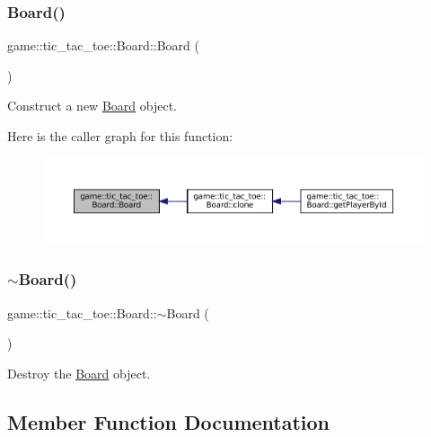 \subsubsection{\texorpdfstring{Board()}{Board()}}
{\footnotesize\ttfamily game\+::tic\+\_\+tac\+\_\+toe\+::\+Board\+::\+Board (\begin{DoxyParamCaption}{ }\end{DoxyParamCaption})}



Construct a new \hyperlink{classgame_1_1tic__tac__toe_1_1_board}{Board} object. 

Here is the caller graph for this function\+:
\nopagebreak
\begin{figure}[H]
\begin{center}
\leavevmode
\includegraphics[width=350pt]{classgame_1_1tic__tac__toe_1_1_board_a90e2255675eacaefca2cd89aea681096_icgraph}
\end{center}
\end{figure}
\mbox{\label{classgame_1_1tic__tac__toe_1_1_board_a9711ce067abe1b2f022fde57106c0425}} 
\subsubsection{\texorpdfstring{$\sim$\+Board()}{~Board()}}
{\footnotesize\ttfamily game\+::tic\+\_\+tac\+\_\+toe\+::\+Board\+::$\sim$\+Board (\begin{DoxyParamCaption}{ }\end{DoxyParamCaption})}



Destroy the \hyperlink{classgame_1_1tic__tac__toe_1_1_board}{Board} object. 



\subsection{Member Function Documentation}
\mbox{\label{classgame_1_1tic__tac__toe_1_1_board_acd788fca5054228f6d44f4c0b5ffca1e}} 
